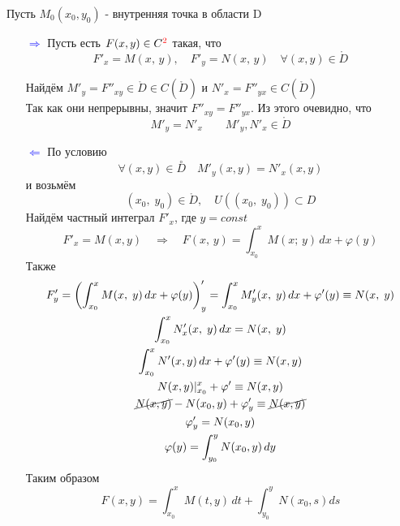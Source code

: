 \begin{Proof}
    Пусть $M_0(x_0, y_0)$ - внутренняя точка в области D
    \begin{enumerate}
        \item[\textcolor{blue}{$\Rightarrow$}]
            Пусть есть $F(x,y)\in C^{\textcolor{red}{2}}$ такая, что 
            \[
                F'_x=M(x,\,y), \quad F'_y=N(x,\,y) \quad \forall (x,y) \in \mathring{D}
            \]
            \begin{figure}[bh]
                \noindent{}
            \end{figure}
            Найдём $M'_y=F''_{xy}\in \mathring{D}\in C(\mathring{D})$ и $N'_x=F''_{yx}\in C(\mathring{D})$\\
            Так как они непрерывны, значит $F''_{xy}=F''_{yx}$. Из этого очевидно, что 
            \[
                 M'_y=N'_x \qquad M'_y, N'_x \in \mathring{D}
            \]
        
        \item[\textcolor{blue}{$\Leftarrow$}] По условию
            \[
                \forall (x,y) \in \overset{\circ}{D} \quad M'_y(x,y)=N'_x(x,y)
            \]
            и возьмём
            \[
                (x_0,\; y_0) \in \mathring{D}, \quad U((x_0,\; y_0)) \subset D
            \]
            Найдём частный интеграл $F'_x$, где $y=const$
            \[
                F'_x=M(x,y) \quad \Rightarrow \quad F(x,\,y)=\int_{x_0}^{x}M(x;\,y)\,dx+\varphi(y)
            \]
            Также
            \begin{gather*}
                F'_y=\left(\int_{x_0}^{x}M(x,\;y)\,dx+\varphi(y)\right)'_y=\int_{x_0}^{x}M'_y(x,\;y)\,dx + \varphi'(y) \equiv N(x,\;y)\\
                \int_{x_0}^{x}N'_x(x,\; y)\,dx = N(x,\; y)\\
                \int_{x_0}^{x}N'(x,y)\,dx+\varphi'(y) \equiv N(x,y)\\
                N(x,y)|_{x_0}^x + \varphi' \equiv N(x,y)\\
                \cancel{N(x,y)} - N(x_0,y) + \varphi'_y \equiv \cancel{N(x,y)}\\
                \varphi'_y=N(x_0,y)\\
                \varphi(y)=\int_{y_0}^{y}N(x_0, y)\,dy
            \end{gather*}
            Таким образом
            \[
                F(x,y)=\int_{x_0}^{x}M(t,y)\,dt+\int_{y_0}^{y}N(x_0,s)ds
            \]
            

\end{enumerate}
\end{Proof}
